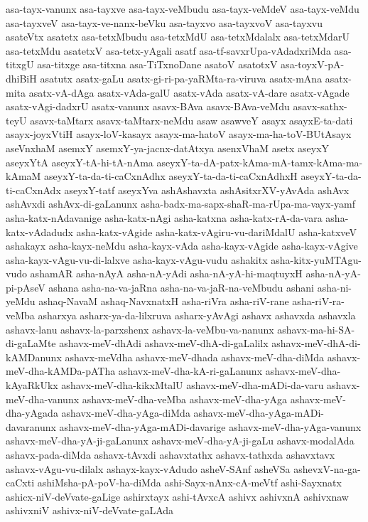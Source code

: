 {asa-tayx-vanunx
asa-tayxve
asa-tayx-veMbudu
asa-tayx-veMdeV
asa-tayx-veMdu
asa-tayxveV
asa-tayx-ve-nanx-beVku
asa-tayxvo
asa-tayxvoV
asa-tayxvu
asateVtx
asatetx
asa-tetxMbudu
asa-tetxMdU
asa-tetxMdalalx
asa-tetxMdarU
asa-tetxMdu
asatetxV
asa-tetx-yAgali
asatf
asa-tf-savxrUpa-vAdadxriMda
asa-titxgU
asa-titxge
asa-titxna
asa-TiTxnoDane
asatoV
asatotxV
asa-toyxV-pA-dhiBiH
asatutx
asatx-gaLu
asatx-gi-ri-pa-yaRMta-ra-viruva
asatx-mAna
asatx-mita
asatx-vA-dAga
asatx-vAda-galU
asatx-vAda
asatx-vA-dare
asatx-vAgade
asatx-vAgi-dadxrU
asatx-vanunx
asavx-BAva
asavx-BAva-veMdu
asavx-sathx-teyU
asavx-taMtarx
asavx-taMtarx-neMdu
asaw
asawveY
asayx
asayxE-ta-dati
asayx-joyxVtiH
asayx-loV-kasayx
asayx-ma-hatoV
asayx-ma-ha-toV-BUtAsayx
aseVnxhaM
asemxY
asemxY-ya-jacnx-datAtxya
asenxVhaM
asetx
aseyxY
aseyxYtA
aseyxY-tA-hi-tA-nAma
aseyxY-ta-dA-patx-kAma-mA-tamx-kAma-ma-kAmaM
aseyxY-ta-da-ti-caCxnAdhx
aseyxY-ta-da-ti-caCxnAdhxH
aseyxY-ta-da-ti-caCxnAdx
aseyxY-tatf
aseyxYva
ashAshavxta
ashAsitxrXV-yAvAda
ashAvx
ashAvxdi
ashAvx-di-gaLanunx
asha-badx-ma-sapx-shaR-ma-rUpa-ma-vayx-yamf
asha-katx-nAdavanige
asha-katx-nAgi
asha-katxna
asha-katx-rA-da-vara
asha-katx-vAdadudx
asha-katx-vAgide
asha-katx-vAgiru-vu-dariMdalU
asha-katxveV
ashakayx
asha-kayx-neMdu
asha-kayx-vAda
asha-kayx-vAgide
asha-kayx-vAgive
asha-kayx-vAgu-vu-di-lalxve
asha-kayx-vAgu-vudu
ashakitx
asha-kitx-yuMTAgu-vudo
ashamAR
asha-nAyA
asha-nA-yAdi
asha-nA-yA-hi-maqtuyxH
asha-nA-yA-pi-pAseV
ashana
asha-na-va-jaRna
asha-na-va-jaR-na-veMbudu
ashani
asha-ni-yeMdu
ashaq-NavaM
ashaq-NavxnatxH
asha-riVra
asha-riV-rane
asha-riV-ra-veMba
asharxya
asharx-ya-da-lilxruva
asharx-yAvAgi
ashavx
ashavxda
ashavxla
ashavx-lanu
ashavx-la-parxshenx
ashavx-la-veMbu-va-nanunx
ashavx-ma-hi-SA-di-gaLaMte
ashavx-meV-dhAdi
ashavx-meV-dhA-di-gaLalilx
ashavx-meV-dhA-di-kAMDanunx
ashavx-meVdha
ashavx-meV-dhada
ashavx-meV-dha-diMda
ashavx-meV-dha-kAMDa-pATha
ashavx-meV-dha-kA-ri-gaLanunx
ashavx-meV-dha-kAyaRkUkx
ashavx-meV-dha-kikxMtalU
ashavx-meV-dha-mADi-da-varu
ashavx-meV-dha-vanunx
ashavx-meV-dha-veMba
ashavx-meV-dha-yAga
ashavx-meV-dha-yAgada
ashavx-meV-dha-yAga-diMda
ashavx-meV-dha-yAga-mADi-davaranunx
ashavx-meV-dha-yAga-mADi-davarige
ashavx-meV-dha-yAga-vanunx
ashavx-meV-dha-yA-ji-gaLanunx
ashavx-meV-dha-yA-ji-gaLu
ashavx-modalAda
ashavx-pada-diMda
ashavx-tAvxdi
ashavxtathx
ashavx-tathxda
ashavxtavx
ashavx-vAgu-vu-dilalx
ashayx-kayx-vAdudo
asheV-SAnf
asheVSa
ashevxV-na-ga-caCxti
ashiMsha-pA-poV-ha-diMda
ashi-Sayx-nAnx-cA-meVtf
ashi-Sayxnatx
ashicx-niV-deVvate-gaLige
ashirxtayx
ashi-tAvxcA
ashivx
ashivxnA
ashivxnaw
ashivxniV
ashivx-niV-deVvate-gaLAda
}
